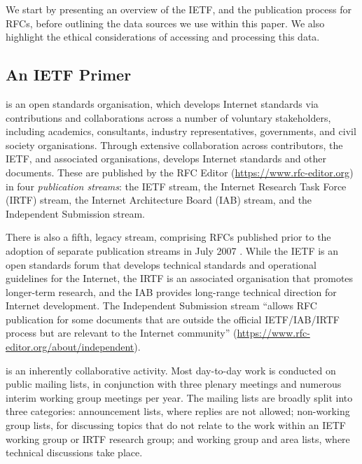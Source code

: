\documentclass[twocolumn,10pt]{article}
\newcommand{\pb}[1]{\vspace{0.75ex}\noindent{\textbf{#1}}}
\begin{document}

We start by presenting an overview of the IETF, and the publication process
for RFCs, before outlining the data sources we use within this paper. We
also highlight the ethical considerations of accessing and processing this
data.


\subsection{An IETF Primer}
\label{sec:background:ietf}


\pb{The IETF} is an open standards organisation, which develops
Internet standards via contributions and collaborations across a number of
voluntary stakeholders, including academics, consultants, industry
representatives, governments, and civil society organisations.  Through
extensive collaboration across contributors, the IETF, and associated
organisations, develops Internet standards and other documents. These are
published by the RFC Editor (\url{https://www.rfc-editor.org}) in four
\emph{publication streams}: the IETF stream, the Internet Research Task
Force (IRTF) stream, the Internet Architecture Board (IAB) stream, and the
Independent Submission stream.

There is also a fifth, legacy stream, comprising RFCs published prior to
the adoption of separate publication streams in July 2007 \cite{RFC4844}.
While the IETF is an open standards forum that develops technical standards
and operational guidelines for the Internet, the IRTF is an associated
organisation that promotes longer-term research, and the IAB provides
long-range technical direction for Internet development. The Independent
Submission stream ``allows RFC publication for some documents that are
outside the official IETF/IAB/IRTF process but are relevant to the Internet
community'' (\url{https://www.rfc-editor.org/about/independent}).

\pb{The standards development process} is an inherently collaborative
activity.  Most day-to-day work is conducted on public mailing lists, in
conjunction with three plenary meetings and numerous interim working group
meetings per year. 
The mailing lists are broadly split into three categories: announcement
lists, where replies are not allowed; non-working group lists, for
discussing topics that do not relate to the work within an IETF working
group or IRTF research group; and working group and area lists, where
technical discussions take place.
\end{document}

